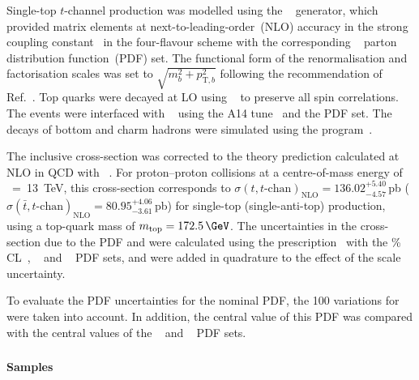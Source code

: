 Single-top $t$-channel production was modelled using the
\POWHEGBOX[v2]~\cite{Frederix:2012dh,Nason:2004rx,Frixione:2007vw,Alioli:2010xd}
generator, which provided matrix elements at next-to-leading-order~(NLO) 
accuracy in the strong coupling constant \alphas\ in the four-flavour 
scheme with the corresponding \NNPDF[3.0nlo]~\cite{Ball:2014uwa} parton
distribution function~(PDF) set.  The functional form of the
renormalisation and factorisation scales was set to
$\sqrt{m_b^2 + p_{\text{T},b}^2}$ following the
recommendation of Ref.~\cite{Frederix:2012dh}. Top quarks were decayed at
LO using \MADSPIN~\cite{Frixione:2007zp,Artoisenet:2012st} to preserve
all spin correlations.  The events were interfaced with
\PYTHIA[8.230]~\cite{Sjostrand:2014zea} using the A14
tune~\cite{ATL-PHYS-PUB-2014-021} and the \NNPDF[2.3lo] PDF set.  
The decays of bottom and charm hadrons were simulated using the
\EVTGEN[1.6.0] program~\cite{Lange:2001uf}.

The inclusive cross-section was corrected to the theory prediction calculated at NLO in QCD with 
\HATHOR[2.1]~\cite{Aliev:2010zk,Kant:2014oha}.
For proton--proton collisions at a centre-of-mass energy of \rts~=~\SI{13}{\TeV}, this cross-section corresponds to
$\sigma(t,t\text{-chan})_\text{NLO}= 136.02^{+5.40}_{-4.57}$\,pb ($\sigma(\bar{t},t\text{-chan})_\text{NLO}=80.95^{+4.06}_{-3.61}$\,pb)
for single-top (single-anti-top) production, using a top-quark mass of $\mtop = 172.5\,\GeV$.
The uncertainties in the cross-section due to the PDF and \alphas were calculated using the \PDFforLHC prescription~\cite{Butterworth:2015oua}
with the \% CL~\cite{Martin:2009iq,Martin:2009bu}, \CT[10nlo]~\cite{Lai:2010vv} 
and \NNPDF[2.3nlo]~\cite{Ball:2012cx} PDF sets,
and were added in quadrature to the effect of the scale uncertainty.



To evaluate the PDF uncertainties for the nominal PDF, the 100 variations for \NNPDF[3.0nlo] were taken into account. 
In addition, the central value of this PDF was compared with the central values of the \CT[14nnlo]~\cite{Dulat:2015mca} 
and \MMHT[nnlo]~\cite{Harland-Lang:2014zoa} PDF sets.


\subsubsection[Powheg+Herwig7]{\POWHER[7]}
\label{subsubsec:tchan_PH7}

\paragraph{Samples}

